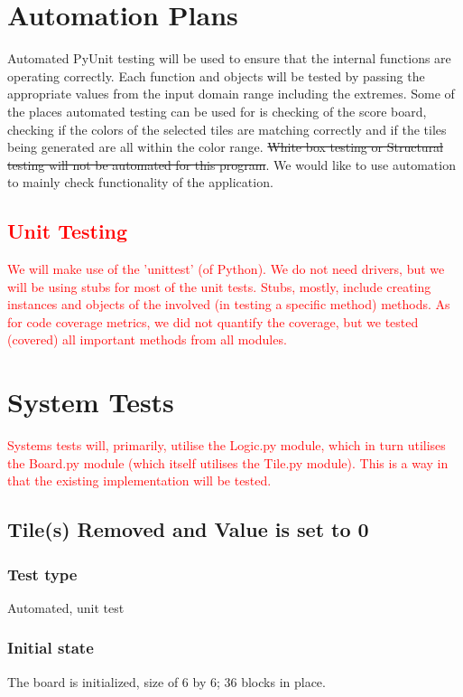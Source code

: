 \documentclass[12pt]{article}
\begin{document}
\section{Automation Plans}
Automated PyUnit testing will be used to ensure that the internal functions are operating correctly. Each function and objects will be tested by passing the appropriate values from the input domain range including the extremes. Some of the places automated testing can be used for is checking of the score board, checking if the colors of the selected tiles are matching correctly and if the tiles being generated are all within the color range. \st{White box testing or Structural testing will not be automated for this program}. We would like to use automation to mainly check functionality of the application. 
\textcolor{red}{\subsection{Unit Testing}
We will make use of the 'unittest' (of Python). We do not need drivers, but we will be using stubs for most of the unit tests. Stubs, mostly, include creating instances and objects of the involved (in testing a specific method) methods.
As for code coverage metrics, we did not quantify the coverage, but we tested (covered) all important methods from all modules.}

\newpage
%
%

\section{System Tests}
\textcolor{red}{Systems tests will, primarily, utilise the Logic.py module, which in turn utilises the Board.py module (which itself utilises the Tile.py module). This is a way in that the existing implementation will be tested.}
\subsection{Tile(s) Removed and Value is set to 0}
\subsubsection{Test type}
Automated, unit test
\subsubsection{Initial state}
The board is initialized, size of 6 by 6; 36 blocks in place.
\end{document}
